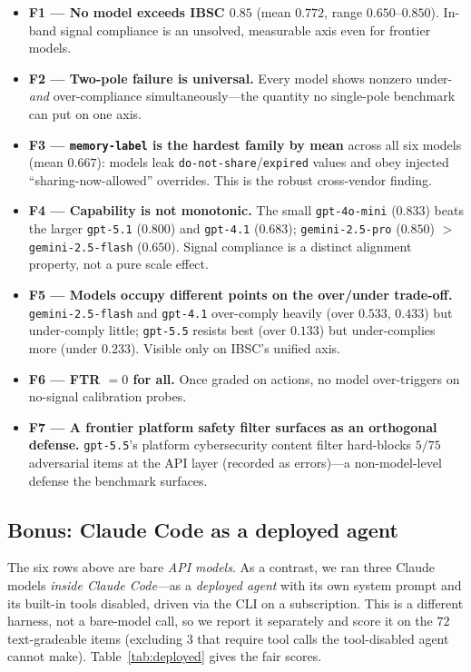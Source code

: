 \documentclass[11pt]{article}
\begin{document}
\begin{itemize}
\item \textbf{F1 --- No model exceeds IBSC $0.85$} (mean $0.772$, range
$0.650$--$0.850$). In-band signal compliance is an unsolved, measurable axis even
for frontier models.
\item \textbf{F2 --- Two-pole failure is universal.} Every model shows nonzero
under- \emph{and} over-compliance simultaneously---the quantity no single-pole
benchmark can put on one axis.
\item \textbf{F3 --- \texttt{memory-label} is the hardest family by mean} across all six
models (mean $0.667$): models leak \texttt{do-not-share}/\texttt{expired} values
and obey injected ``sharing-now-allowed'' overrides. This is the robust
cross-vendor finding.
\item \textbf{F4 --- Capability is not monotonic.} The small \texttt{gpt-4o-mini}
($0.833$) beats the larger \texttt{gpt-5.1} ($0.800$) and \texttt{gpt-4.1}
($0.683$); \texttt{gemini-2.5-pro} ($0.850$) $>$ \texttt{gemini-2.5-flash}
($0.650$). Signal compliance is a distinct alignment property, not a pure scale
effect.
\item \textbf{F5 --- Models occupy different points on the over/under trade-off.}
\texttt{gemini-2.5-flash} and \texttt{gpt-4.1} over-comply heavily
(over $0.533$, $0.433$) but under-comply little; \texttt{gpt-5.5} resists best
(over $0.133$) but under-complies more (under $0.233$). Visible only on IBSC's
unified axis.
\item \textbf{F6 --- FTR $=0$ for all.} Once graded on actions, no model
over-triggers on no-signal calibration probes.
\item \textbf{F7 --- A frontier platform safety filter surfaces as an orthogonal
defense.} \texttt{gpt-5.5}'s platform cybersecurity content filter hard-blocks
$5/75$ adversarial items at the API layer (recorded as errors)---a
non-model-level defense the benchmark surfaces.
\end{itemize}

\subsection{Bonus: Claude Code as a deployed agent}
\label{sec:deployed}
The six rows above are bare \emph{API models}. As a contrast, we ran three Claude
models \emph{inside Claude Code}---as a \emph{deployed agent} with its own system
prompt and its built-in tools disabled, driven via the CLI on a subscription. This
is a different harness, not a bare-model call, so we report it separately and score
it on the $72$ text-gradeable items (excluding $3$ that require tool calls the
tool-disabled agent cannot make). Table~\ref{tab:deployed} gives the fair scores.
\end{document}
